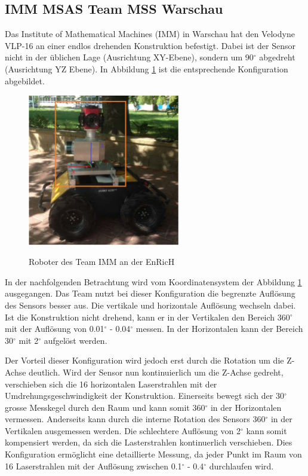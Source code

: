  \subsection{IMM MSAS Team MSS Warschau}
 \label{subsec:IMM}
Das Institute of Mathematical Machines (IMM) in Warschau hat den Velodyne VLP-16 an einer endlos drehenden Konstruktion befestigt. Dabei ist der Sensor nicht in der üblichen Lage (Ausrichtung XY-Ebene), sondern um 90$^\circ$ abgedreht (Ausrichtung YZ Ebene). In Abbildung \ref{fig:imm} ist die entsprechende Konfiguration abgebildet. 

   \begin{figure}[H]
	\centering
	\includegraphics[width=0.6\textwidth]
	{resources/IMM_cop.PNG}
	\caption[Roboter des Team IMM EnRicH]{Roboter des Team IMM an der EnRicH} \protect\cite{IMM}
	\label{fig:imm}
\end{figure}

In der nachfolgenden Betrachtung wird vom Koordinatensystem der Abbildung \ref{fig:imm} ausgegangen.
Das Team nutzt bei dieser Konfiguration die begrenzte Auflösung des Sensors besser aus. Die vertikale und horizontale Auflösung wechseln dabei. Ist die Konstruktion nicht drehend, kann er in der Vertikalen den Bereich 360$^\circ$ mit der Auflösung von 0.01$^\circ$ - 0.04$^\circ$ messen. In der Horizontalen kann der Bereich 30$^\circ$ mit 2$^\circ$ aufgelöst werden. 

Der Vorteil dieser Konfiguration wird jedoch erst durch die Rotation um die Z-Achse deutlich. Wird der Sensor nun kontinuierlich um die Z-Achse gedreht, verschieben sich die 16 horizontalen Laserstrahlen mit der Umdrehungsgeschwindigkeit der Konstruktion. Einerseits bewegt sich der 30$^\circ$ grosse Messkegel durch den Raum und kann somit 360$^\circ$ in der Horizontalen vermessen. Anderseits kann durch die interne Rotation des Sensors 360$^\circ$  in der Vertikalen ausgemessen werden. Die schlechtere Auflösung von 2$^\circ$ kann somit kompensiert werden, da sich die Lasterstrahlen kontinuerlich verschieben. Dies Konfiguration ermöglicht eine detaillierte Messung, da jeder Punkt im Raum von 16 Laserstrahlen mit der Auflösung zwischen 0.1$^\circ$ - 0.4$^\circ$ durchlaufen wird. 

